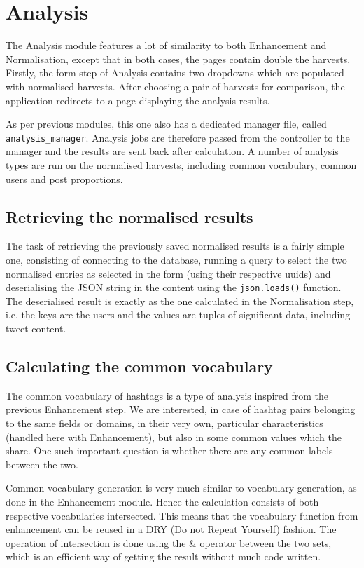 \documentclass[12pt,a4paper,twoside]{report}
\begin{document}
\section{Analysis}
The Analysis module features a lot of similarity to both Enhancement and Normalisation, except that in both cases, the pages contain double the harvests. Firstly, the form step of Analysis contains two dropdowns which are populated with normalised harvests. After choosing a pair of harvests for comparison, the application redirects to a page displaying the analysis results.

As per previous modules, this one also has a dedicated manager file, called \texttt{analysis\_manager}. Analysis jobs are therefore passed from the controller to the manager and the results are sent back after calculation. A number of analysis types are run on the normalised harvests, including common vocabulary, common users and post proportions.

\subsection{Retrieving the normalised results}
The task of retrieving the previously saved normalised results is a fairly simple one, consisting of connecting to the database, running a query to select the two normalised entries as selected in the form (using their respective uuids) and deserialising the JSON string in the content using the \texttt{json.loads()} function. The deserialised result is exactly as the one calculated in the Normalisation step, i.e. the keys are the users and the values are tuples of significant data, including tweet content.

\subsection{Calculating the common vocabulary}
The common vocabulary of hashtags is a type of analysis inspired from the previous Enhancement step. We are interested, in case of hashtag pairs belonging to the same fields or domains, in their very own, particular characteristics (handled here with Enhancement), but also in some common values which the share. One such important question is whether there are any common labels between the two.

Common vocabulary generation is very much similar to vocabulary generation, as done in the Enhancement module. Hence the calculation consists of both respective vocabularies intersected. This means that the vocabulary function from enhancement can be reused in a DRY (Do not Repeat Yourself) fashion. The operation of intersection is done using the \& operator between the two sets, which is an efficient way of getting the result without much code written.
\end{document}
